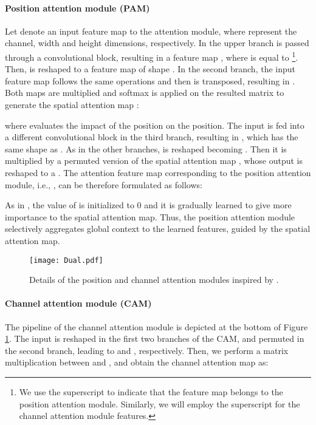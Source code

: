 \documentclass[journal]{IEEEtran}
\begin{document}
\paragraph*{\textbf{Position attention module (PAM)}}Let denote  an input feature map to the attention module, where  represent the channel, width and height dimensions, respectively. In the upper branch  is passed through a convolutional block, resulting in a feature map , where  is equal to \footnote{We use the superscript  to indicate that the feature map belongs to the position attention module. Similarly, we will employ the superscript  for the channel attention module features.}. Then,  is reshaped to a feature map of shape . In the second branch, the input feature map  follows the same operations and then is transposed, resulting in . Both maps are multiplied and softmax is applied on the resulted matrix to generate the spatial attention map :



where  evaluates the impact of the  position on the  position. The input  is fed into a different convolutional block in the third branch, resulting in , which has the same shape as . As in the other branches,  is reshaped becoming . Then it is multiplied by a permuted version of the spatial attention map , whose output is reshaped to a . The attention feature map corresponding to the position attention module, i.e., , can be therefore formulated as follows:



As in \cite{fu2018dual}, the value of  is initialized to 0 and it is gradually learned to give more importance to the spatial attention map. Thus, the position attention module selectively aggregates global context to the learned features, guided by the spatial attention map. 

\begin{figure}[h!]
    \centering
    \texttt{[image: Dual.pdf]}
    \caption{Details of the position and channel attention modules inspired by \cite{fu2018dual}.}
    \label{fig:dual}
\end{figure}



\paragraph*{\textbf{Channel attention module (CAM)}}
The pipeline of the channel attention module is depicted at the bottom of Figure \ref{fig:dual}. The input  is reshaped in the first two branches of the CAM, and permuted in the second branch, leading to  and 
, respectively. Then, we perform a matrix multiplication between  and , and obtain the channel attention map  as: 
\end{document}

